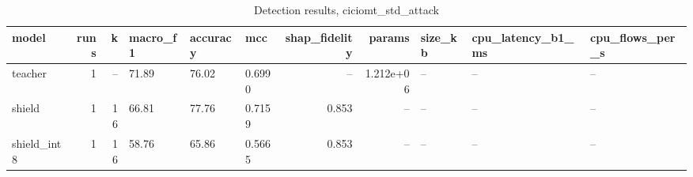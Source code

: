 \begin{table}
\caption{Detection results, ciciomt_std_attack}
\begin{tabular}{lrrlllrrlll}
\toprule
model & runs & k & macro_f1 & accuracy & mcc & shap_fidelity & params & size_kb & cpu_latency_b1_ms & cpu_flows_per_s \\
\midrule
teacher & 1 & -- & 71.89 & 76.02 & 0.6990 & -- & 1.212e+06 & -- & -- & -- \\
shield & 1 & 16 & 66.81 & 77.76 & 0.7159 & 0.853 & -- & -- & -- & -- \\
shield_int8 & 1 & 16 & 58.76 & 65.86 & 0.5665 & 0.853 & -- & -- & -- & -- \\
\bottomrule
\end{tabular}
\end{table}
